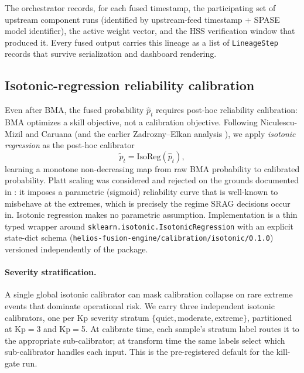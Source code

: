 \documentclass[11pt,letterpaper]{article}
\begin{document}
The orchestrator records, for each fused timestamp, the participating set
of upstream component runs (identified by upstream-feed timestamp + SPASE
model identifier), the active weight vector, and the HSS verification window
that produced it.  Every fused output carries this lineage as a list of
\texttt{LineageStep} records that survive serialization and dashboard rendering.

\subsection{Isotonic-regression reliability calibration}
\label{sec:methods:isotonic}

Even after BMA, the fused probability $\hat{p}_t$ requires post-hoc reliability
calibration: BMA optimizes a skill objective, not a calibration objective.
Following Niculescu-Mizil and Caruana \cite{niculescu2005} (and the earlier
Zadrozny--Elkan analysis \cite{zadrozny2002}), we apply \emph{isotonic regression}
as the post-hoc calibrator
\begin{equation}
  \tilde{p}_t = \mathrm{IsoReg}(\hat{p}_t),
\end{equation}
learning a monotone non-decreasing map from raw BMA probability to calibrated
probability.  Platt scaling \cite{platt1999} was considered and rejected on
the grounds documented in \cite{niculescu2005}: it imposes a parametric
(sigmoid) reliability curve that is well-known to misbehave at the extremes,
which is precisely the regime SRAG decisions occur in.  Isotonic regression
makes no parametric assumption.  Implementation is a thin typed wrapper
around \texttt{sklearn.isotonic.IsotonicRegression} with an explicit
state-dict schema (\texttt{helios-fusion-engine/calibration/isotonic/0.1.0})
versioned independently of the package.

\paragraph{Severity stratification.}
A single global isotonic calibrator can mask calibration collapse on rare
extreme events that dominate operational risk.  We carry three independent
isotonic calibrators, one per Kp severity stratum
$\{\mathrm{quiet}, \mathrm{moderate}, \mathrm{extreme}\}$, partitioned at
Kp$=$3 and Kp$=$5.  At calibrate time, each sample's stratum label routes
it to the appropriate sub-calibrator; at transform time the same labels
select which sub-calibrator handles each input.  This is the
pre-registered default for the kill-gate run.
\end{document}
